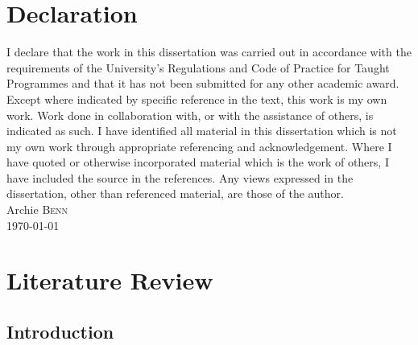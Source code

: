 \documentclass[paper=a4,fontsize=12pt]{scrartcl}
\begin{document}
\section*{Declaration}
I declare that the work in this dissertation was carried out in accordance with the requirements of the University’s Regulations and Code of Practice for Taught Programmes and that it has not been submitted for any other academic award. Except where indicated by specific reference in the text, this work is my own work. Work done in collaboration with, or with the assistance of others, is indicated as such. I have identified all material in this dissertation which is not my own work through appropriate referencing and acknowledgement. Where I have quoted or otherwise incorporated material which is the work of others, I have included the source in the references. Any views expressed in the dissertation, other than referenced material, are those of the author. \newline \\Archie \textsc{Benn} \\\today

\newpage
\tableofcontents
\newpage


\section{Literature Review}
\subsection{Introduction}
\end{document}
